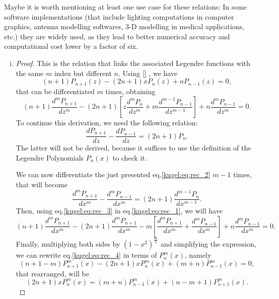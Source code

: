 Maybe it is worth mentioning at least one use case for these relations: In some software implementations (that include lighting computations in computer graphics, antenna modelling softwares, 3-D modelling in medical applications, etc.) 
they are widely used, as they lead to better numerical accuracy and computational cost lower by a factor of six\cite{usecase_recursion_paper}. 
\begin{enumerate}[(i)]
  \item 
  \begin{proof}
    This is the relation that links the associated Legendre functions with the same $m$ index but different $n$. Using \ref{} , we have 
    \begin{equation*}
      (n+1)P_{n+1}(z)-(2n+1)xP_n(z)+nP_{n-1}(z)=0,
    \end{equation*}
    that can be differentiated $m$ times, obtaining
    \begin{equation}\label{kugel:eq:rec_1}
      (n+1)\frac{d^mP_{n+1}}{dz^m}-(2n+1) \left[z \frac{d^m P_n}{dz^m}+ m\frac{d^{m-1}P_{n-1}}{dz^{m-1}} \right] + n\frac{d^m P_{n-1}}{dz^m}=0.
    \end{equation}
    To continue this derivation, we need the following relation:
    \begin{equation}\label{kugel:eq:rec_2}
      \frac{dP_{n+1}}{dz} - \frac{dP_{n-1}}{dz} = (2n+1)P_n.
    \end{equation}
    The latter will not be derived, because it suffices to use the definition of the Legendre Polynomials $P_n(x)$ to check it.
    
    We can now differentiate the just presented eq.\eqref{kugel:eq:rec_2} $m-1$ times, that will become
    \begin{equation}\label{kugel:eq:rec_3}
      \frac{d^mP_{n+1}}{dx^m} - \frac{d^mP_{n-1}}{dx^m} = (2n+1)\frac{d^{m-1}P_n}{dx^{m-1}}.
    \end{equation}
    Then, using eq.\eqref{kugel:eq:rec_3} in eq.\eqref{kugel:eq:rec_1}, we will have
    \begin{equation}\label{kugel:eq:rec_4}
      (n+1)\frac{d^mP_{n+1}}{dx^m}- (2n+1)\frac{d^mP_{n+1}}{dx^m} -m\left[\frac{d^m P_{n+1}}{dx^m}+ \frac{d^{m}P_{n-1}}{dx^m}\right] + n\frac{d^m P_{n-1}}{dx^m}=0.
    \end{equation}
    Finally, multiplying both sides by $(1-x^2)^{\frac{m}{2}}$ and simplifying the expression, we can rewrite eq.\eqref{kugel:eq:rec_4} in terms of $P^m_n(x)$, namely
    \begin{equation*}
      (n+1-m)P^m_{n+1}(x)-(2n+1)xP^m_n(x)+(m+n)P^m_{n-1}(x)=0,
    \end{equation*}
    that rearranged, will be
    \begin{equation*}
      (2n+1) x P^m_n(x)= (m+n) P^m_{n-1}(x) + (n-m+1) P^m_{n+1}(x).
    \end{equation*}
  \end{proof}
  

\end{enumerate}
